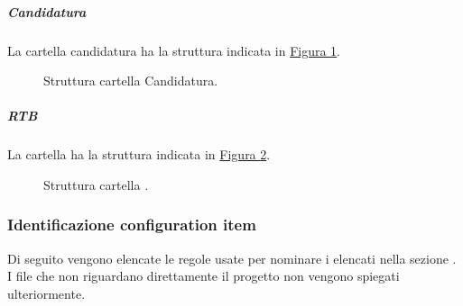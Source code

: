 \subparagraph{Candidatura}
La cartella candidatura ha la struttura indicata in \hyperref[fig:repo_sorgenti_documenti_candidatura]{Figura \ref{fig:repo_sorgenti_documenti_candidatura}}.
\begin{figure}[H]
    \caption{Struttura cartella Candidatura.}
    \label{fig:repo_sorgenti_documenti_candidatura}
\end{figure}

\subparagraph{RTB}
La cartella  ha la struttura indicata in \hyperref[fig:repo_sorgenti_documenti_RTB]{Figura \ref{fig:repo_sorgenti_documenti_RTB}}.
\begin{figure}[H]
    \caption{Struttura cartella .}
    \label{fig:repo_sorgenti_documenti_RTB}
\end{figure}

\subsubsection{Identificazione configuration item}
\label{subsubsec:identificazione_CI}
Di seguito vengono elencate le regole usate per nominare i  elencati nella sezione \hyperref[subsubsec:repository]{}.
I file che non riguardano direttamente il progetto non vengono spiegati ulteriormente. 


